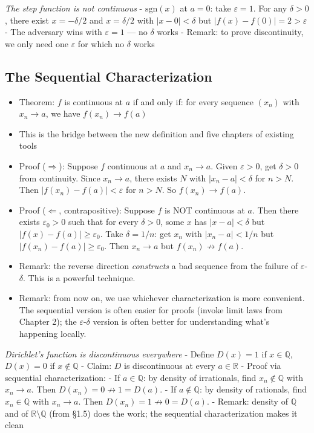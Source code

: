 \documentclass[
  10pt,
  letterpaper,
]{scrbook}
\providecommand{\tightlist}{%
  \setlength{\itemsep}{0pt}\setlength{\parskip}{0pt}}
\newcommand{\QQ}{\mathbb{Q}}
\newcommand{\RR}{\mathbb{R}}
\begin{document}
\emph{The step function is not continuous} - \(\text{sgn}(x)\) at
\(a = 0\): take \(\varepsilon = 1\). For any \(\delta > 0\), there exist
\(x = -\delta/2\) and \(x = \delta/2\) with \(|x - 0| < \delta\) but
\(|f(x) - f(0)| = 2 > \varepsilon\) - The adversary wins with
\(\varepsilon = 1\) --- no \(\delta\) works - Remark: to prove
discontinuity, we only need one \(\varepsilon\) for which no \(\delta\)
works

\subsection{The Sequential
Characterization}\label{the-sequential-characterization}

\begin{itemize}
\tightlist
\item
  Theorem: \(f\) is continuous at \(a\) if and only if: for every
  sequence \((x_n)\) with \(x_n \to a\), we have \(f(x_n) \to f(a)\)
\item
  This is the bridge between the new definition and five chapters of
  existing tools
\item
  Proof (\(\Rightarrow\)): Suppose \(f\) continuous at \(a\) and
  \(x_n \to a\). Given \(\varepsilon > 0\), get \(\delta > 0\) from
  continuity. Since \(x_n \to a\), there exists \(N\) with
  \(|x_n - a| < \delta\) for \(n > N\). Then
  \(|f(x_n) - f(a)| < \varepsilon\) for \(n > N\). So
  \(f(x_n) \to f(a)\).
\item
  Proof (\(\Leftarrow\), contrapositive): Suppose \(f\) is NOT
  continuous at \(a\). Then there exists \(\varepsilon_0 > 0\) such that
  for every \(\delta > 0\), some \(x\) has \(|x - a| < \delta\) but
  \(|f(x) - f(a)| \geq \varepsilon_0\). Take \(\delta = 1/n\): get
  \(x_n\) with \(|x_n - a| < 1/n\) but
  \(|f(x_n) - f(a)| \geq \varepsilon_0\). Then \(x_n \to a\) but
  \(f(x_n) \not\to f(a)\).
\item
  Remark: the reverse direction \emph{constructs} a bad sequence from
  the failure of \(\varepsilon\)-\(\delta\). This is a powerful
  technique.
\item
  Remark: from now on, we use whichever characterization is more
  convenient. The sequential version is often easier for proofs (invoke
  limit laws from Chapter 2); the \(\varepsilon\)-\(\delta\) version is
  often better for understanding what's happening locally.
\end{itemize}

\emph{Dirichlet's function is discontinuous everywhere} - Define
\(D(x) = 1\) if \(x \in \QQ\), \(D(x) = 0\) if \(x \notin \QQ\) - Claim:
\(D\) is discontinuous at every \(a \in \RR\) - Proof via sequential
characterization: - If \(a \in \QQ\): by density of irrationals, find
\(x_n \notin \QQ\) with \(x_n \to a\). Then
\(D(x_n) = 0 \not\to 1 = D(a)\). - If \(a \notin \QQ\): by density of
rationals, find \(x_n \in \QQ\) with \(x_n \to a\). Then
\(D(x_n) = 1 \not\to 0 = D(a)\). - Remark: density of \(\QQ\) and of
\(\RR \setminus \QQ\) (from §1.5) does the work; the sequential
characterization makes it clean
\end{document}
